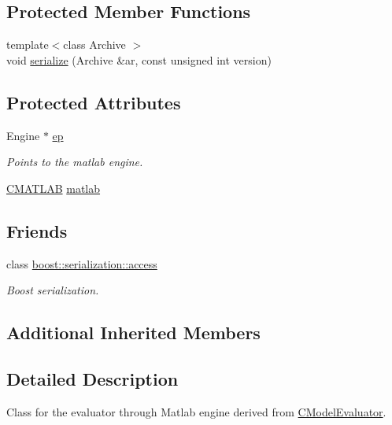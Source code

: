 \subsection*{Protected Member Functions}
\begin{DoxyCompactItemize}
\item 
{\footnotesize template$<$class Archive $>$ }\\void \hyperlink{class_go_s_u_m_1_1_c_matlab_engine_evaluator_ad33ed3b3581e5da2f7575c0e3f1d9e55}{serialize} (Archive \&ar, const unsigned int version)
\end{DoxyCompactItemize}
\subsection*{Protected Attributes}
\begin{DoxyCompactItemize}
\item 
Engine $\ast$ \hyperlink{class_go_s_u_m_1_1_c_matlab_engine_evaluator_a27f4cdd2025a3dbcc975dc75d8fffb14}{ep}
\begin{DoxyCompactList}\small\item\em Points to the matlab engine. \end{DoxyCompactList}\item 
\hyperlink{class_c_m_a_t_l_a_b}{C\-M\-A\-T\-L\-A\-B} \hyperlink{class_go_s_u_m_1_1_c_matlab_engine_evaluator_ae5cb5436e2edaabb0f0db24d41daac0f}{matlab}
\end{DoxyCompactItemize}
\subsection*{Friends}
\begin{DoxyCompactItemize}
\item 
class \hyperlink{class_go_s_u_m_1_1_c_matlab_engine_evaluator_ac98d07dd8f7b70e16ccb9a01abf56b9c}{boost\-::serialization\-::access}
\begin{DoxyCompactList}\small\item\em Boost serialization. \end{DoxyCompactList}\end{DoxyCompactItemize}
\subsection*{Additional Inherited Members}


\subsection{Detailed Description}
Class for the evaluator through Matlab engine derived from \hyperlink{class_go_s_u_m_1_1_c_model_evaluator}{C\-Model\-Evaluator}. 

